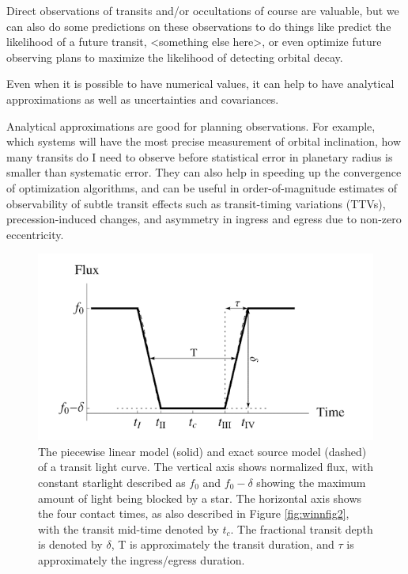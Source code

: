 \documentclass[oneside,12pt]{amsart}
\numberwithin{page}{section}
\begin{document}
Direct observations of transits and/or occultations of course are valuable, but we can also do some predictions on these observations to do things like predict the likelihood of a future transit, <something else here>, or even optimize future observing plans to maximize the likelihood of detecting orbital decay. 

Even when it is possible to have numerical values, it can help to have analytical approximations as well as uncertainties and covariances. 

Analytical approximations are good for planning observations. For example, which systems will have the most precise measurement of orbital inclination, how many transits do I need to observe before statistical error in planetary radius is smaller than systematic error. They can also help in speeding up the convergence of optimization algorithms, and can be useful in order-of-magnitude estimates of observability of subtle transit effects such as transit-timing variations (TTVs), precession-induced changes, and asymmetry in ingress and egress due to non-zero eccentricity.

\begin{figure}[htbp]
    \centering
    \includegraphics[width=0.8\linewidth]{figs/carter_fig1.png}
    \caption{The piecewise linear model (solid) and exact source model (dashed) of a transit light curve. The vertical axis shows normalized flux, with constant starlight described as $f_0$ and $f_0-\delta$ showing the maximum amount of light being blocked by a star. The horizontal axis shows the four contact times, as also described in Figure \ref{fig:winnfig2}, with the transit mid-time denoted by $t_c$. The fractional transit depth is denoted by $\delta$, T is approximately the transit duration, and $\tau$ is approximately the ingress/egress duration.}
    \label{fig:carter-fig1}
\end{figure}

\end{document}
